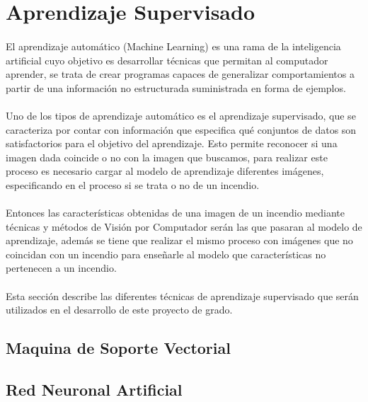 \section{Aprendizaje Supervisado}

\paragraph{} El aprendizaje automático (Machine Learning) es una rama de la inteligencia artificial cuyo objetivo es desarrollar técnicas que permitan al computador aprender, se trata de crear programas capaces de generalizar comportamientos a partir de una información no estructurada suministrada en forma de ejemplos.

\paragraph{} Uno de los tipos de aprendizaje automático es el aprendizaje supervisado, que se caracteriza por contar con información que especifica qué conjuntos de datos son satisfactorios para el objetivo del aprendizaje. Esto permite reconocer si una imagen dada coincide o no con la imagen que buscamos, para realizar este proceso es necesario cargar al modelo de aprendizaje diferentes imágenes, especificando en el proceso si se trata o no de un incendio.

\paragraph{} Entonces las características obtenidas de una imagen de un incendio mediante técnicas y métodos de Visión por Computador serán las que pasaran al modelo de aprendizaje, además se tiene que realizar el mismo proceso con imágenes que no coincidan con un incendio para enseñarle al modelo que características no pertenecen a un incendio.

\paragraph{} Esta sección describe las diferentes técnicas de aprendizaje supervisado que serán utilizados en el desarrollo de este proyecto de grado.

\subsection{Maquina de Soporte Vectorial}

\subsection{Red Neuronal Artificial}

